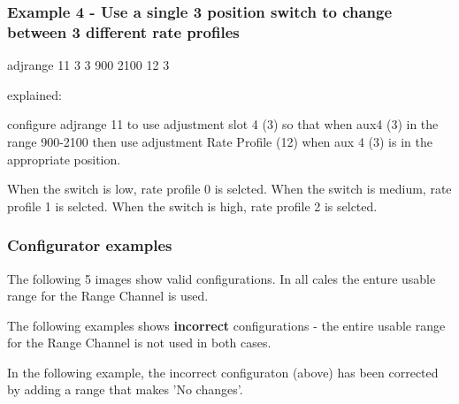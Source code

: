 \subsubsection*{Example 4 -\/ Use a single 3 position switch to change between 3 different rate profiles}

adjrange 11 3 3 900 2100 12 3

explained\+:


\begin{DoxyItemize}
\item configure adjrange 11 to use adjustment slot 4 (3) so that when aux4 (3) in the range 900-\/2100 then use adjustment Rate Profile (12) when aux 4 (3) is in the appropriate position.
\end{DoxyItemize}

When the switch is low, rate profile 0 is selcted. When the switch is medium, rate profile 1 is selcted. When the switch is high, rate profile 2 is selcted.

\subsubsection*{Configurator examples}

The following 5 images show valid configurations. In all cales the enture usable range for the Range Channel is used.

 



 



 



 





The following examples shows {\bfseries incorrect} configurations -\/ the entire usable range for the Range Channel is not used in both cases.

 

In the following example, the incorrect configuraton (above) has been corrected by adding a range that makes 'No changes'.

 